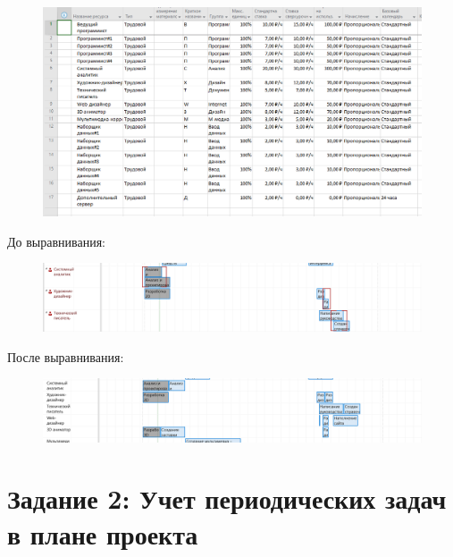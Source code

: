 \begin{figure}[H]
	\begin{center}
		\includegraphics[width=\textwidth]{imgs/task_1_1.png}
	\end{center}
\end{figure}

До выравнивания:

\begin{figure}[H]
	\begin{center}
		\includegraphics[width=\textwidth]{imgs/task_1_2.png}
	\end{center}
\end{figure}

После выравнивания:

\begin{figure}[H]
	\begin{center}
		\includegraphics[width=\textwidth]{imgs/task_1_3.png}
	\end{center}
\end{figure}

\section*{Задание 2: Учет периодических задач в плане проекта}

